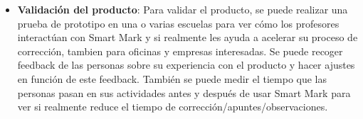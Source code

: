 \documentclass[a4paper,12pt]{article}
\begin{document}
\begin{itemize}
\begin{itemize}
\item \textbf{Validación del producto}: Para validar el producto, se puede realizar una prueba de prototipo en una o varias escuelas para ver cómo los profesores interactúan con Smart Mark y si realmente les ayuda a acelerar su proceso de corrección, tambien para oficinas y empresas interesadas. Se puede recoger feedback de las personas sobre su experiencia con el producto y hacer ajustes en función de este feedback. También se puede medir el tiempo que las personas pasan en sus actividades antes y después de usar Smart Mark para ver si realmente reduce el tiempo de corrección/apuntes/observaciones.
\end{itemize}
\end{itemize}
\end{document}
